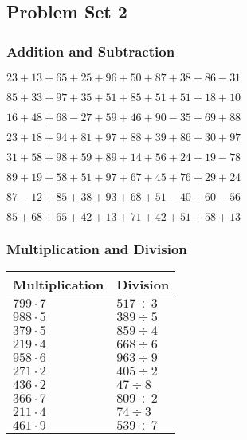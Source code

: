 \hypertarget{problem-set-2}{%
\subsection{Problem Set 2}\label{problem-set-2}}

\hypertarget{addition-and-subtraction}{%
\subsubsection{Addition and
Subtraction}\label{addition-and-subtraction}}

\(23+13+65+25+96+50+87+38-86-31\)

\(85+33+97+35+51+85+51+51+18+10\)

\(16+48+68-27+59+46+90-35+69+88\)

\(23+18+94+81+97+88+39+86+30+97\)

\(31+58+98+59+89+14+56+24+19-78\)

\(89+19+58+51+97+67+45+76+29+24\)

\(87-12+85+38+93+68+51-40+60-56\)

\(85+68+65+42+13+71+42+51+58+13\)

\hypertarget{multiplication-and-division}{%
\subsubsection{Multiplication and
Division}\label{multiplication-and-division}}

\begin{longtable}[]{@{}ll@{}}
\toprule
Multiplication & Division\tabularnewline
\midrule
\endhead
\(799\cdot7\) & \(517÷3\)\tabularnewline
\(988\cdot5\) & \(389÷5\)\tabularnewline
\(379\cdot5\) & \(859÷4\)\tabularnewline
\(219\cdot4\) & \(668÷6\)\tabularnewline
\(958\cdot6\) & \(963÷9\)\tabularnewline
\(271\cdot2\) & \(405÷2\)\tabularnewline
\(436\cdot2\) & \(47÷8\)\tabularnewline
\(366\cdot7\) & \(809÷2\)\tabularnewline
\(211\cdot4\) & \(74÷3\)\tabularnewline
\(461\cdot9\) & \(539÷7\)\tabularnewline
\bottomrule
\end{longtable}
